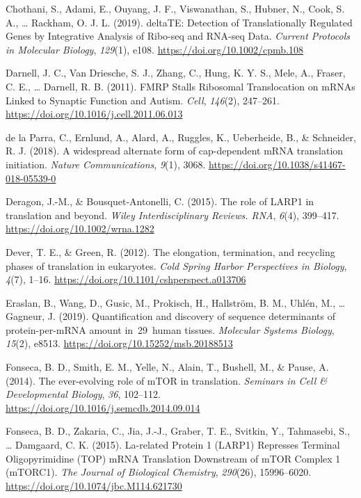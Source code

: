 \documentclass[12pt,openany]{book}
\begin{document}
\hypertarget{ref-Chothani2019}{}
Chothani, S., Adami, E., Ouyang, J. F., Viswanathan, S., Hubner, N.,
Cook, S. A., \ldots{} Rackham, O. J. L. (2019). deltaTE: Detection of
Translationally Regulated Genes by Integrative Analysis of Ribo-seq and
RNA-seq Data. \emph{Current Protocols in Molecular Biology},
\emph{129}(1), e108. \url{https://doi.org/10.1002/cpmb.108}

\hypertarget{ref-Darnell2011}{}
Darnell, J. C., Van Driesche, S. J., Zhang, C., Hung, K. Y. S., Mele,
A., Fraser, C. E., \ldots{} Darnell, R. B. (2011). FMRP Stalls Ribosomal
Translocation on mRNAs Linked to Synaptic Function and Autism.
\emph{Cell}, \emph{146}(2), 247--261.
\url{https://doi.org/10.1016/j.cell.2011.06.013}

\hypertarget{ref-delaParra2018}{}
de la Parra, C., Ernlund, A., Alard, A., Ruggles, K., Ueberheide, B., \&
Schneider, R. J. (2018). A widespread alternate form of cap-dependent
mRNA translation initiation. \emph{Nature Communications}, \emph{9}(1),
3068. \url{https://doi.org/10.1038/s41467-018-05539-0}

\hypertarget{ref-Deragon2015}{}
Deragon, J.-M., \& Bousquet-Antonelli, C. (2015). The role of LARP1 in
translation and beyond. \emph{Wiley Interdisciplinary Reviews. RNA},
\emph{6}(4), 399--417. \url{https://doi.org/10.1002/wrna.1282}

\hypertarget{ref-Dever2012}{}
Dever, T. E., \& Green, R. (2012). The elongation, termination, and
recycling phases of translation in eukaryotes. \emph{Cold Spring Harbor
Perspectives in Biology}, \emph{4}(7), 1--16.
\url{https://doi.org/10.1101/cshperspect.a013706}

\hypertarget{ref-Eraslan2019}{}
Eraslan, B., Wang, D., Gusic, M., Prokisch, H., Hallström, B. M., Uhlén,
M., \ldots{} Gagneur, J. (2019). Quantification and discovery of
sequence determinants of protein-per-mRNA amount in~29~human tissues.
\emph{Molecular Systems Biology}, \emph{15}(2), e8513.
\url{https://doi.org/10.15252/msb.20188513}

\hypertarget{ref-Fonseca2014}{}
Fonseca, B. D., Smith, E. M., Yelle, N., Alain, T., Bushell, M., \&
Pause, A. (2014). The ever-evolving role of mTOR in translation.
\emph{Seminars in Cell \& Developmental Biology}, \emph{36}, 102--112.
\url{https://doi.org/10.1016/j.semcdb.2014.09.014}

\hypertarget{ref-Fonseca2015}{}
Fonseca, B. D., Zakaria, C., Jia, J.-J., Graber, T. E., Svitkin, Y.,
Tahmasebi, S., \ldots{} Damgaard, C. K. (2015). La-related Protein 1
(LARP1) Represses Terminal Oligopyrimidine (TOP) mRNA Translation
Downstream of mTOR Complex 1 (mTORC1). \emph{The Journal of Biological
Chemistry}, \emph{290}(26), 15996--6020.
\url{https://doi.org/10.1074/jbc.M114.621730}
\end{document}
